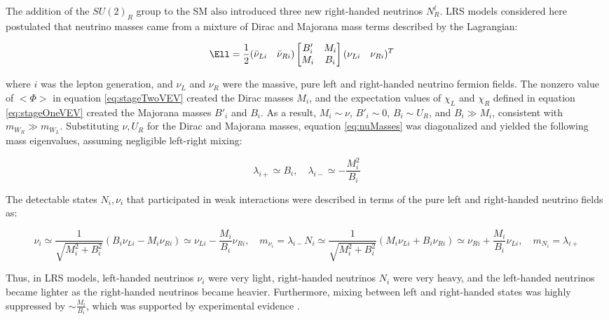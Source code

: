The addition of the $SU(2)_{R}$ group to the SM also introduced three new right-handed neutrinos $N^{l}_{R}$.  
LRS models considered here postulated that neutrino masses came from a mixture of Dirac and Majorana mass 
terms \cite{seeSawAndParityViolation,seeSawAndGUTs} described by the Lagrangian:

\begin{align}
	\Ell &= \frac{1}{2}(\bar{\nu}_{Li} \quad \bar{\nu}_{Ri})\begin{bmatrix}
	B'_{i} & M_{i} \\
	M_{i} & B_{i}
\end{bmatrix}(\nu_{Li} \quad \nu_{Ri})^{T}
\label{eq:nuMasses}
\end{align}

where $i$ was the lepton generation, and $\nu_{L}$ and $\nu_{R}$ were the massive, pure left and right-handed 
neutrino fermion fields.  The nonzero value of $<\Phi>$ in equation \ref{eq:stageTwoVEV} created the 
Dirac masses $M_{i}$, and the expectation values of $\chi_{L}$ and $\chi_{R}$ defined in equation \ref{eq:stageOneVEV} 
created the Majorana masses $B'_{i}$ and $B_{i}$.  As a result, $M_{i} \sim \nu$, $B'_{i} \sim 0$, 
$B_{i} \sim U_{R}$, and $B_{i} \gg M_{i}$, consistent with $m_{W_{R}} \gg m_{W_{L}}$.  Substituting 
$\nu,U_{R}$ for the Dirac and Majorana masses, equation \ref{eq:nuMasses} was diagonalized and 
yielded the following mass eigenvalues, assuming negligible left-right mixing:

\begin{equation}
	\lambda_{i+} \simeq B_{i},  \quad \lambda_{i-} \simeq -\frac{M^{2}_{i}}{B_{i}}
\end{equation}

The detectable states $N_{i}, \nu_{i}$ that participated in weak interactions were described in terms of 
the pure left and right-handed neutrino fields as:

\begin{equation}
	\nu_{i} \simeq \frac{1}{\sqrt{M^{2}_{i} + B^{2}_{i}}}(B_{i}\nu_{Li} - M_{i}\nu_{Ri}) \simeq \nu_{Li} - \frac{M_{i}}{B_{i}}\nu_{Ri} , \quad m_{\nu_{i}} = \lambda_{i-}
	
	N_{i} \simeq \frac{1}{\sqrt{M^{2}_{i} + B^{2}_{i}}}(M_{i}\nu_{Li} + B_{i}\nu_{Ri}) \simeq \nu_{Ri} + \frac{M_{i}}{B_{i}}\nu_{Li} , \quad m_{N_{i}} = \lambda_{i+}
\end{equation}

Thus, in LRS models, left-handed neutrinos $\nu_{i}$ were very light,  right-handed neutrinos $N_{i}$ were very 
heavy, and the left-handed neutrinos became lighter as the right-handed neutrinos became heavier.  Furthermore, 
mixing between left and right-handed states was highly suppressed by $\sim \frac{M_{i}}{B_{i}}$, which was 
supported by experimental evidence \cite{dZeroMixingLimits,theoreticalMixingLimits}.

